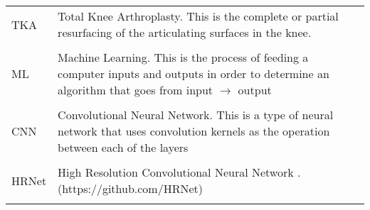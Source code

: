 \singlespacing
\begin{tabular}{l p{5in}} 
TKA & Total Knee Arthroplasty. This is the complete or partial resurfacing of the articulating surfaces in the knee.\\
\\
ML & Machine Learning. This is the process of feeding a computer inputs and outputs in order to determine an algorithm that goes from input $\longrightarrow$ output\\
\\
CNN & Convolutional Neural Network. This is a type of neural network that uses convolution kernels as the operation between each of the layers\\
\\
HRNet & High Resolution Convolutional Neural Network \cite{wangDeepHighResolutionRepresentation2020}. (https://github.com/HRNet)\\
\\
\end{tabular}

\doublespacing
